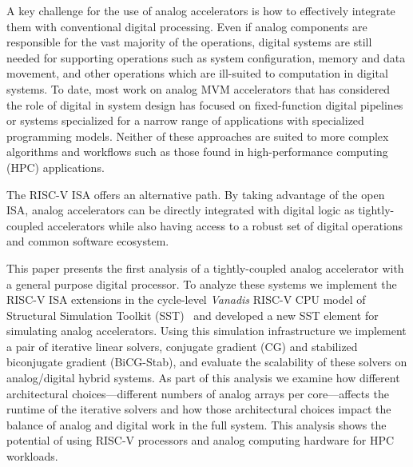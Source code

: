 A key challenge for the use of analog accelerators is how to effectively integrate them with conventional digital processing.
Even if analog components are responsible for the vast majority of the operations, digital systems are still needed for supporting operations such as system configuration, memory and data movement, and other operations which are ill-suited to computation in digital systems.
To date, most work on analog MVM accelerators that has considered the role of digital in system design has focused on fixed-function digital pipelines or systems specialized for a narrow range of applications with specialized programming models.
Neither of these approaches are suited to more complex algorithms and workflows such as those found in high-performance computing (HPC) applications.

The RISC-V ISA offers an alternative path.
By taking advantage of the open ISA, analog accelerators can be directly integrated with digital logic as tightly-coupled accelerators while also having access to a robust set of digital operations and common software ecosystem.

This paper presents the first analysis of a tightly-coupled analog accelerator with a general purpose digital processor.
To analyze these systems we implement the RISC-V ISA extensions in the cycle-level \textit{Vanadis} RISC-V CPU model of Structural Simulation Toolkit (SST)~\cite{10.1145/1964218.1964225} and developed a new SST element for simulating analog accelerators.
Using this simulation infrastructure we implement a pair of iterative linear solvers, conjugate gradient (CG) and stabilized biconjugate gradient (BiCG-Stab), and evaluate the scalability of these solvers on analog/digital hybrid systems.
As part of this analysis we examine how different architectural choices---different numbers of analog arrays per core---affects the runtime of the iterative solvers and how those architectural choices impact the balance of analog and digital work in the full system.
This analysis shows the potential of using RISC-V processors and analog computing hardware for HPC workloads.
